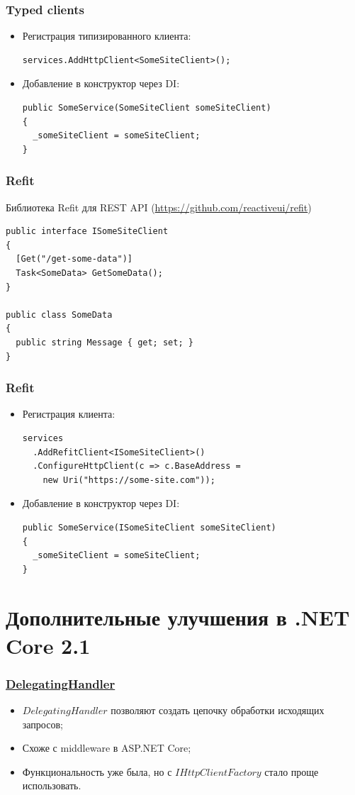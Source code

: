 \documentclass{beamer}
\begin{document}
\begin{frame}[fragile]
\frametitle{Typed clients}
\begin{itemize}
\item<1-> Регистрация типизированного клиента:
\begin{lstlisting}
services.AddHttpClient<SomeSiteClient>();
\end{lstlisting}
\item<2-> Добавление в конструктор через DI:
\begin{lstlisting}
public SomeService(SomeSiteClient someSiteClient)
{
  _someSiteClient = someSiteClient;
}
\end{lstlisting}
\end{itemize}
\end{frame}

\begin{frame}[fragile]
\frametitle{Refit}
Библиотека Refit для REST API (\href{https://github.com/reactiveui/refit}{https://github.com/reactiveui/refit})
\newline
\begin{lstlisting}
public interface ISomeSiteClient
{
  [Get("/get-some-data")]
  Task<SomeData> GetSomeData();
}

public class SomeData
{
  public string Message { get; set; }
}
\end{lstlisting}
\end{frame}

\begin{frame}[fragile]
\frametitle{Refit}
\begin{itemize}
\item<1-> Регистрация клиента:
\begin{lstlisting}
services
  .AddRefitClient<ISomeSiteClient>()
  .ConfigureHttpClient(c => c.BaseAddress = 
    new Uri("https://some-site.com"));
\end{lstlisting}
\item<2-> Добавление в конструктор через DI:
\begin{lstlisting}
public SomeService(ISomeSiteClient someSiteClient)
{
  _someSiteClient = someSiteClient;
}
\end{lstlisting}
\end{itemize}
\end{frame}

\section{Дополнительные улучшения в .NET Core 2.1}
\begin{frame}
\frametitle{\href{https://docs.microsoft.com/en-us/dotnet/api/system.net.http.delegatinghandler?view=netcore-2.2}{DelegatingHandler}}
\begin{itemize}
\item $DelegatingHandler$ позволяют создать цепочку обработки исходящих запросов;
\item Схоже с middleware в ASP.NET Core;
\item Функциональность уже была, но с $IHttpClientFactory$ стало проще использовать.
\end{itemize}
\end{frame}
\end{document}
